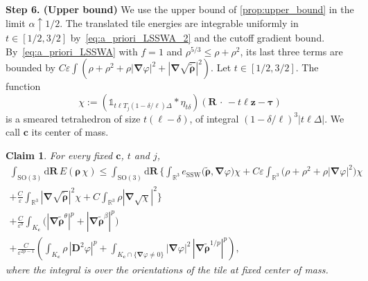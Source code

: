 \documentclass[final,reqno]{amsart}
\newtheorem*{claim}{Claim}
\theoremstyle{remark}
\renewcommand{\le}{\leqslant}
\renewcommand{\epsilon}{\varepsilon}
\newcommand{\wt}[1]{\widetilde{#1}}
\newcommand{\RR}{\mathbb{R}}
\newcommand{\SO}{\mathrm{SO}}
\newcommand{\SSW}{\mathrm{SSW}}
\newcommand{\iden}{\mathbb{1}}
\newcommand{\grad}{\bm{\nabla}}
\newcommand{\tetra}{\mathbb{\Delta}}
\newcommand{\dd}{\mathrm{d}}
\begin{document}
\medskip

\noindent\textbf{Step 6. (Upper bound)} We use the upper bound of \cref{prop:upper_bound} in the limit $\alpha\uparrow1/2$. The translated tile energies are integrable uniformly in $t\in[1/2,3/2]$ by~\cref{eq:a_priori_LSSWA_2} and the cutoff gradient bound. By~\cref{eq:a_priori_LSSWA} with $f=1$ and $\rho^{5/3}\le\rho+\rho^2$, its last three terms are bounded by $C\epsilon\int(\rho+\rho^2+\rho|\grad\varphi|^2+|\grad\sqrt{\wt{\bm{\rho}}}|^2)$. Let $t\in[1/2,3/2]$. The function
$$
\chi:=(\iden_{t\ell T_j(1-\delta/\ell)\tetra}\ast\eta_{t\delta})(\mathbf{R}\,\cdot\,-t\ell\mathbf{z}-\bm{\tau})
$$
is a smeared tetrahedron of size $t(\ell-\delta)$, of integral $(1-\delta/\ell)^3|t\ell\tetra|$. We call $\mathbf{c}$ its center of mass.

\begin{claim}
For every fixed $\mathbf{c}$, $t$ and $j$,
\begin{multline}\label{eq:estim_local_upper_SSW}
\int_{\SO(3)}\dd\mathbf{R}\,E(\bm{\rho}\,\chi)\le\int_{\SO(3)}\dd\mathbf{R}\,\bigg\{\int_{\RR^3}e_\SSW\big(\wt{\bm{\rho}},\grad\varphi\big)\chi+C\epsilon\int_{\RR^3}\big(\rho+\rho^2+\rho|\grad\varphi|^2\big)\chi\\
+\frac C\epsilon\int_{\RR^3}|\grad\sqrt{\wt{\bm{\rho}}}|^2\chi+C\int_{\RR^3}\rho|\grad\sqrt\chi|^2\bigg\}\\
+\frac{C}{\epsilon^b}\int_{K_{\mathbf{c}}}\Big(|\grad\wt{\bm{\rho}}^\theta|^p+|\grad\wt{\bm{\rho}}^\beta|^p\Big)\\
+\frac{C}{\epsilon^{2p-1}}\left(\int_{K_{\mathbf{c}}}\rho\,|\mathbf{D}^2\varphi|^p
+\int_{K_{\mathbf{c}}\cap\{\grad\varphi\ne0\}}|\grad\varphi|^2\,|\grad\wt{\bm{\rho}}^{1/p}|^p\right),
\end{multline}
where the integral is over the orientations of the tile at fixed center of mass.
\end{claim}
\end{document}
